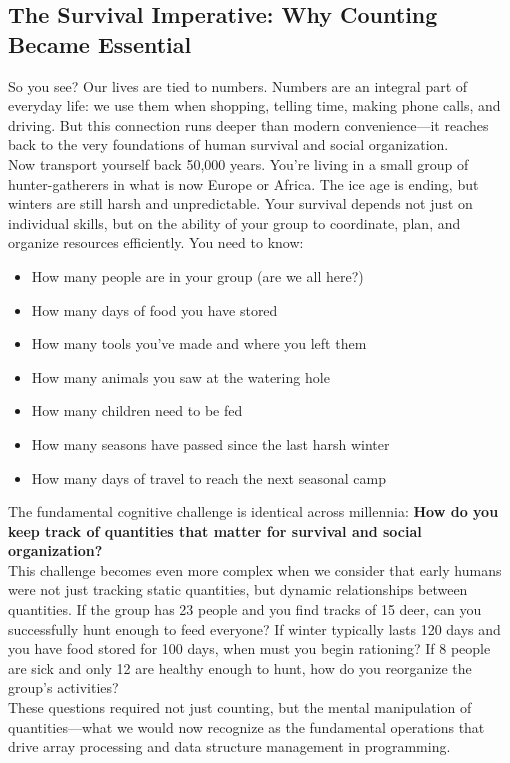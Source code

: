 \subsection{The Survival Imperative: Why Counting Became Essential}

So you see? Our lives are tied to numbers. Numbers are an integral part of everyday life: we use them when shopping, telling time, making phone calls, and driving. But this connection runs deeper than modern convenience—it reaches back to the very foundations of human survival and social organization.\\
Now transport yourself back 50,000 years. You're living in a small group of hunter-gatherers in what is now Europe or Africa. The ice age is ending, but winters are still harsh and unpredictable. Your survival depends not just on individual skills, but on the ability of your group to coordinate, plan, and organize resources efficiently. You need to know:
\begin{itemize}
	\item How many people are in your group (are we all here?)
	\item How many days of food you have stored
	\item How many tools you've made and where you left them  
	\item How many animals you saw at the watering hole
	\item How many children need to be fed
	\item How many seasons have passed since the last harsh winter
	\item How many days of travel to reach the next seasonal camp
\end{itemize}
The fundamental cognitive challenge is identical across millennia: \textbf{How do you keep track of quantities that matter for survival and social organization?}\\
This challenge becomes even more complex when we consider that early humans were not just tracking static quantities, but dynamic relationships between quantities. If the group has 23 people and you find tracks of 15 deer, can you successfully hunt enough to feed everyone? If winter typically lasts 120 days and you have food stored for 100 days, when must you begin rationing? If 8 people are sick and only 12 are healthy enough to hunt, how do you reorganize the group's activities?\\
These questions required not just counting, but the mental manipulation of quantities—what we would now recognize as the fundamental operations that drive array processing and data structure management in programming.

